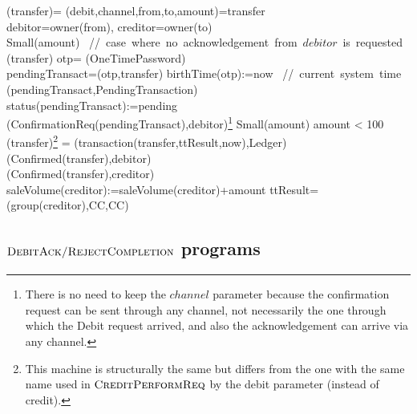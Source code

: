 \begin{asm}
(transfer)=\+
\LET (debit,channel,from,to,amount)=transfer \\
\LET debitor=owner(from), creditor=owner(to)\\
\IF Small(amount) 
\mbox{  // case where no acknowledgement from $debitor$ is requested} \THEN \+
	(transfer) \-
\ELSE \+
       \LET otp= \NEW(OneTimePassword)\\
       \LET pendingTransact=(otp,transfer)\+
          birthTime(otp):=now \mbox{ // current system time}\\
          (pendingTransact,PendingTransaction)\\ 
          status(pendingTransact):=pending \\
          (ConfirmationReq(pendingTransact),\TO debitor)\footnote{There is no need to keep the $channel$ parameter because the confirmation request can be sent through any channel, not necessarily the one through which the Debit request arrived, and also the acknowledgement can arrive via any channel.}
       \dec\dec\-
\WHERE \+
Small(amount) \IFF amount < 100 \\
 (transfer)\footnote{This machine is structurally the same but differs from the one with the same name used in $\hbox{\sc CreditPerformReq}$ by the debit parameter (instead of credit).} =\+     
   (transaction(transfer,ttResult,now),Ledger)\\
   (Confirmed(transfer),\TO debitor)\\
   (Confirmed(transfer),\TO creditor)\\
   saleVolume(creditor):=saleVolume(creditor)+amount \-
ttResult=(group(creditor),CC,CC)
\end{asm}

\smallskip
\subsection{ $\hbox{\sc DebitAck/RejectCompletion}$ programs}
\label{sect:debitackreject}
